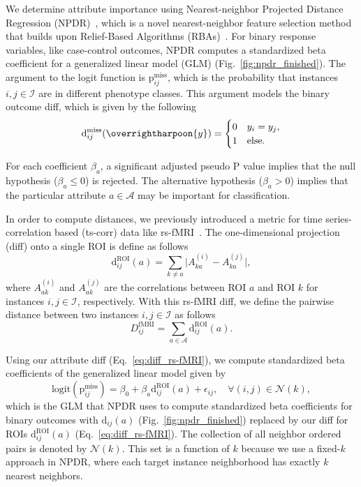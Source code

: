 \documentclass[10pt,letterpaper]{article}\usepackage[]{graphicx}\usepackage[]{color}
\begin{document}
\bigskip

We determine attribute importance using Nearest-neighbor Projected Distance Regression (NPDR)~\cite{npdr}, which is a novel nearest-neighbor feature selection method that builds upon Relief-Based Algorithms (RBAs)~\cite{robnik2003,urbanowicz17}. For binary response variables, like case-control outcomes, NPDR computes a standardized beta coefficient for a generalized linear model (GLM) (Fig.~\ref{fig:npdr_finished}). The argument to the logit function is $\text{p}^\text{miss}_{ij}$, which is the probability that instances $i,j \in \mathcal{I}$ are in different phenotype classes. This argument models the binary outcome diff, which is given by the following
%
\begin{equation}\label{eq:diff_outcome}
\text{d}^\text{miss}_{ij}(\overrightharpoon{y})=\begin{cases}
0 & y_i = y_j, \\
1 & \text{else}.
\end{cases}
\end{equation}

For each coefficient $\beta_a$, a significant adjusted pseudo P value implies that the null hypothesis ($\beta_a \leq 0$) is rejected. The alternative hypothesis ($\beta_a > 0$) implies that the particular attribute $a \in \mathcal{A}$ may be important for classification.

In order to compute distances, we previously introduced a metric for time series-correlation based (ts-corr) data like rs-fMRI~\cite{dawkins2019}. The one-dimensional projection (diff) onto a single ROI is define as follows
%
\begin{equation}\label{eq:diff_rs-fMRI}
\text{d}^\text{ROI}_{ij}(a) = \sum_{k \neq a}\bigl|A^{(i)}_{ka} - A^{(j)}_{ka}\bigr|,
\end{equation}
%
where $A^{(i)}_{ak}$ and $A^{(j)}_{ak}$ are the correlations between ROI $a$ and ROI $k$ for instances $i,j \in \mathcal{I}$, respectively. With this rs-fMRI diff, we define the pairwise distance between two instances $i,j \in \mathcal{I}$ as follows
%
\begin{equation}\label{eq:D_rs-fMRI}
D^\text{fMRI}_{ij} = \sum_{a \in \mathcal{A}} \text{d}^\text{ROI}_{ij}(a).
\end{equation}

Using our attribute diff (Eq.~\ref{eq:diff_rs-fMRI}), we compute standardized beta coefficients of the generalized linear model given by
%
\begin{equation}\label{eq:glm_roi}
\text{logit}\left(\text{p}^\text{miss}_{ij}\right) = \beta_0 + \beta_a \text{d}^\text{ROI}_{ij}(a) + \epsilon_{ij}, \quad \forall(i,j) \in \mathcal{N}(k),
\end{equation}
%
which is the GLM that NPDR uses to compute standardized beta coefficients for binary outcomes with $\text{d}_{ij}(a)$ (Fig.~\ref{fig:npdr_finished}) replaced by our diff for ROIs $\text{d}^\text{ROI}_{ij}(a)$ (Eq.~\ref{eq:diff_rs-fMRI}). The collection of all neighbor ordered pairs is denoted by $\mathcal{N}(k)$. This set is a function of $k$ because we use a fixed-$k$ approach in NPDR, where each target instance neighborhood has exactly $k$ nearest neighbors.
\end{document}
